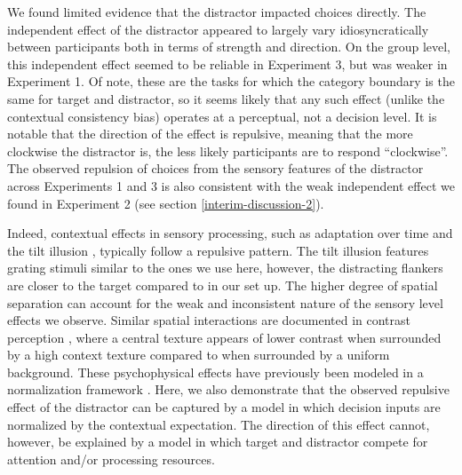 \documentclass[a4paper, nobind]{templates/ociamthesis}
\begin{document}
We found limited evidence that the distractor impacted choices directly. The independent effect of the distractor appeared to largely vary idiosyncratically between participants both in terms of strength and direction. On the group level, this independent effect seemed to be reliable in Experiment 3, but was weaker in Experiment 1. Of note, these are the tasks for which the category boundary is the same for target and distractor, so it seems likely that any such effect (unlike the contextual consistency bias) operates at a perceptual, not a decision level. It is notable that the direction of the effect is repulsive, meaning that the more clockwise the distractor is, the less likely participants are to respond ``clockwise''. The observed repulsion of choices from the sensory features of the distractor across Experiments 1 and 3 is also consistent with the weak independent effect we found in Experiment 2 (see section \ref{interim-discussion-2}).

Indeed, contextual effects in sensory processing, such as adaptation over time \autocite{webster2015} and the tilt illusion \autocite{blakemore1970}, typically follow a repulsive pattern. The tilt illusion features grating stimuli similar to the ones we use here, however, the distracting flankers are closer to the target compared to in our set up. The higher degree of spatial separation can account for the weak and inconsistent nature of the sensory level effects we observe. Similar spatial interactions are documented in contrast perception \autocite{chubb1989,xing2001}, where a central texture appears of lower contrast when surrounded by a high context texture compared to when surrounded by a uniform background. These psychophysical effects have previously been modeled in a normalization framework \autocite{carandini2012}. Here, we also demonstrate that the observed repulsive effect of the distractor can be captured by a model in which decision inputs are normalized by the contextual expectation. The direction of this effect cannot, however, be explained by a model in which target and distractor compete for attention and/or processing resources.
\end{document}
